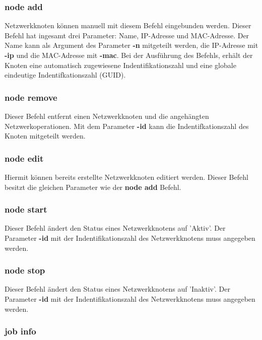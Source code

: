 \documentclass[12pt,a4paper]{report}
\begin{document}
\begin{onehalfspace}
\subsubsection{node add}

Netzwerkknoten können manuell mit diesem Befehl eingebunden werden. Dieser Befehl hat ingesamt drei Parameter: Name, IP-Adresse und MAC-Adresse. Der Name kann als Argument des Parameter \textbf{-n} mitgeteilt werden, die IP-Adresse mit \textbf{-ip} und die MAC-Adresse mit \textbf{-mac}. Bei der Ausführung des Befehls, erhält der Knoten eine automatisch zugewiesene Indentifikationszahl und eine globale eindeutige Indentifkationszahl (GUID).

\subsubsection{node remove}

Dieser Befehl entfernt einen Netzwerkknoten und die angehängten Netzwerkoperationen. Mit dem Parameter \textbf{-id} kann die Indentifkationszahl des Knoten mitgeteilt werden.

\subsubsection{node edit}

Hiermit können bereits erstellte Netzwerkknoten editiert werden. Dieser Befehl besitzt die gleichen Parameter wie der \textbf{node add} Befehl.

\subsubsection{node start}

Dieser Befehl ändert den Status eines Netzwerkknotens auf 'Aktiv'. Der Parameter \textbf{-id} mit der Indentifikationszahl des Netzwerkknotens muss angegeben werden.

\subsubsection{node stop}

Dieser Befehl ändert den Status eines Netzwerkknotens auf 'Inaktiv'. Der Parameter \textbf{-id} mit der Indentifikationszahl des Netzwerkknotens muss angegeben werden.

\subsubsection{job info}


\end{onehalfspace}
\end{document}
